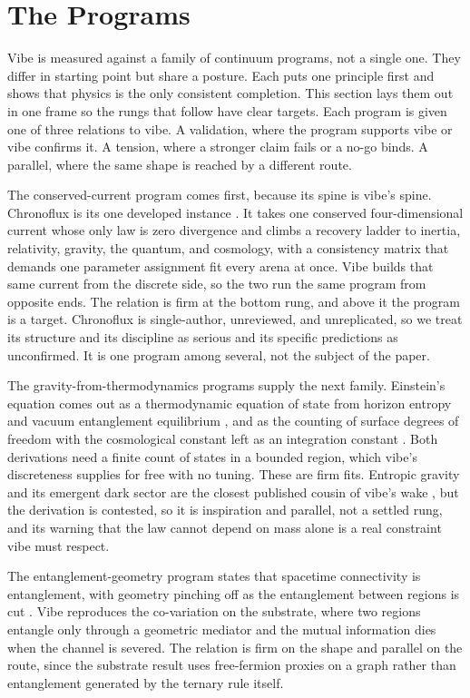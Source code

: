 \section{The Programs}

Vibe is measured against a family of continuum programs, not a single one. They differ in starting point but share a posture. Each puts one principle first and shows that physics is the only consistent completion. This section lays them out in one frame so the rungs that follow have clear targets. Each program is given one of three relations to vibe. A validation, where the program supports vibe or vibe confirms it. A tension, where a stronger claim fails or a no-go binds. A parallel, where the same shape is reached by a different route.

The conserved-current program comes first, because its spine is vibe's spine. Chronoflux is its one developed instance \cite{herbert2025chronoflux}. It takes one conserved four-dimensional current whose only law is zero divergence and climbs a recovery ladder to inertia, relativity, gravity, the quantum, and cosmology, with a consistency matrix that demands one parameter assignment fit every arena at once. Vibe builds that same current from the discrete side, so the two run the same program from opposite ends. The relation is firm at the bottom rung, and above it the program is a target. Chronoflux is single-author, unreviewed, and unreplicated, so we treat its structure and its discipline as serious and its specific predictions as unconfirmed. It is one program among several, not the subject of the paper.

The gravity-from-thermodynamics programs supply the next family. Einstein's equation comes out as a thermodynamic equation of state from horizon entropy and vacuum entanglement equilibrium \cite{jacobson1995, jacobson2016}, and as the counting of surface degrees of freedom with the cosmological constant left as an integration constant \cite{padmanabhan2010}. Both derivations need a finite count of states in a bounded region, which vibe's discreteness supplies for free with no tuning. These are firm fits. Entropic gravity and its emergent dark sector are the closest published cousin of vibe's wake \cite{verlinde2011}, but the derivation is contested, so it is inspiration and parallel, not a settled rung, and its warning that the law cannot depend on mass alone is a real constraint vibe must respect.

The entanglement-geometry program states that spacetime connectivity is entanglement, with geometry pinching off as the entanglement between regions is cut \cite{vanraamsdonk2010}. Vibe reproduces the co-variation on the substrate, where two regions entangle only through a geometric mediator and the mutual information dies when the channel is severed. The relation is firm on the shape and parallel on the route, since the substrate result uses free-fermion proxies on a graph rather than entanglement generated by the ternary rule itself.

